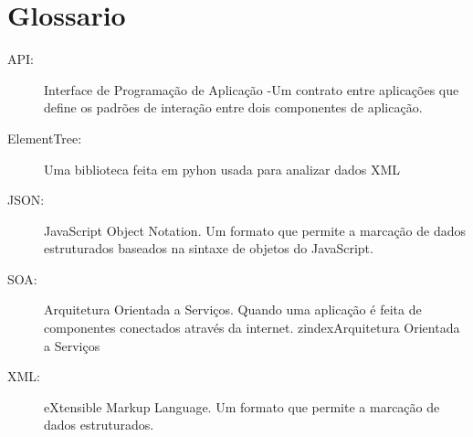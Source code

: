 \section{Glossario}

\begin{description}

\item[API:] Interface de Programação de Aplicação -Um contrato entre
aplicações que define os padrões de interação entre dois componentes
de aplicação.

\item[ElementTree:] Uma biblioteca feita em pyhon usada para analizar
dados XML
\index[ElementTree]

\item[JSON:] JavaScript Object Notation. Um formato que permite a
marcação de dados estruturados baseados na sintaxe de objetos do
JavaScript.

\item[SOA:]  Arquitetura Orientada a Serviços. Quando uma aplicação
é feita de componentes conectados através da internet.
zindex{Arquitetura Orientada a Serviços}

\item[XML:] eXtensible Markup Language. Um formato que permite a
marcação de dados estruturados.

\end{description}

